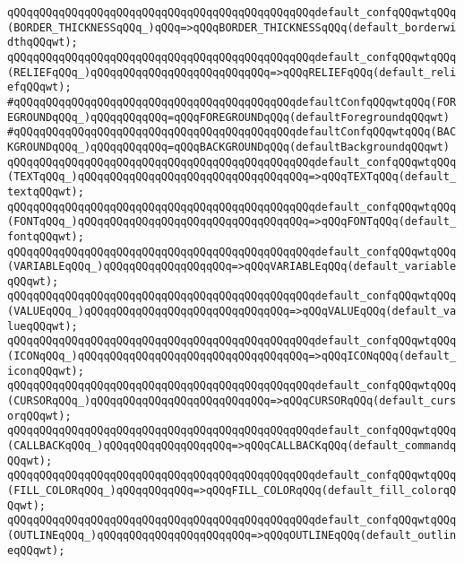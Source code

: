 \verb|qQQqqQQqqQQqqQQqqQQqqQQqqQQqqQQqqQQqqQQqqQQqqQQqdefault_confqQQqwtqQQq(BORDER_THICKNESSqQQq_)qQQq=>qQQqBORDER_THICKNESSqQQq(default_borderwidthqQQqwt);|\newline
\verb|qQQqqQQqqQQqqQQqqQQqqQQqqQQqqQQqqQQqqQQqqQQqqQQqdefault_confqQQqwtqQQq(RELIEFqQQq_)qQQqqQQqqQQqqQQqqQQqqQQqqQQq=>qQQqRELIEFqQQq(default_reliefqQQqwt);|\newline
\newline
\verb|#qQQqqQQqqQQqqQQqqQQqqQQqqQQqqQQqqQQqqQQqqQQqdefaultConfqQQqwtqQQq(FOREGROUNDqQQq_)qQQqqQQqqQQq=qQQqFOREGROUNDqQQq(defaultForegroundqQQqwt)|\newline
\verb|#qQQqqQQqqQQqqQQqqQQqqQQqqQQqqQQqqQQqqQQqqQQqdefaultConfqQQqwtqQQq(BACKGROUNDqQQq_)qQQqqQQqqQQq=qQQqBACKGROUNDqQQq(defaultBackgroundqQQqwt)|\newline
\newline
\verb|qQQqqQQqqQQqqQQqqQQqqQQqqQQqqQQqqQQqqQQqqQQqqQQqdefault_confqQQqwtqQQq(TEXTqQQq_)qQQqqQQqqQQqqQQqqQQqqQQqqQQqqQQqqQQq=>qQQqTEXTqQQq(default_textqQQqwt);|\newline
\verb|qQQqqQQqqQQqqQQqqQQqqQQqqQQqqQQqqQQqqQQqqQQqqQQqdefault_confqQQqwtqQQq(FONTqQQq_)qQQqqQQqqQQqqQQqqQQqqQQqqQQqqQQqqQQq=>qQQqFONTqQQq(default_fontqQQqwt);|\newline
\verb|qQQqqQQqqQQqqQQqqQQqqQQqqQQqqQQqqQQqqQQqqQQqqQQqdefault_confqQQqwtqQQq(VARIABLEqQQq_)qQQqqQQqqQQqqQQqqQQq=>qQQqVARIABLEqQQq(default_variableqQQqwt);|\newline
\verb|qQQqqQQqqQQqqQQqqQQqqQQqqQQqqQQqqQQqqQQqqQQqqQQqdefault_confqQQqwtqQQq(VALUEqQQq_)qQQqqQQqqQQqqQQqqQQqqQQqqQQqqQQq=>qQQqVALUEqQQq(default_valueqQQqwt);|\newline
\verb|qQQqqQQqqQQqqQQqqQQqqQQqqQQqqQQqqQQqqQQqqQQqqQQqdefault_confqQQqwtqQQq(ICONqQQq_)qQQqqQQqqQQqqQQqqQQqqQQqqQQqqQQqqQQq=>qQQqICONqQQq(default_iconqQQqwt);|\newline
\verb|qQQqqQQqqQQqqQQqqQQqqQQqqQQqqQQqqQQqqQQqqQQqqQQqdefault_confqQQqwtqQQq(CURSORqQQq_)qQQqqQQqqQQqqQQqqQQqqQQqqQQq=>qQQqCURSORqQQq(default_cursorqQQqwt);|\newline
\verb|qQQqqQQqqQQqqQQqqQQqqQQqqQQqqQQqqQQqqQQqqQQqqQQqdefault_confqQQqwtqQQq(CALLBACKqQQq_)qQQqqQQqqQQqqQQqqQQq=>qQQqCALLBACKqQQq(default_commandqQQqwt);|\newline
\verb|qQQqqQQqqQQqqQQqqQQqqQQqqQQqqQQqqQQqqQQqqQQqqQQqdefault_confqQQqwtqQQq(FILL_COLORqQQq_)qQQqqQQqqQQq=>qQQqFILL_COLORqQQq(default_fill_colorqQQqwt);|\newline
\verb|qQQqqQQqqQQqqQQqqQQqqQQqqQQqqQQqqQQqqQQqqQQqqQQqdefault_confqQQqwtqQQq(OUTLINEqQQq_)qQQqqQQqqQQqqQQqqQQqqQQq=>qQQqOUTLINEqQQq(default_outlineqQQqwt);|\newline
